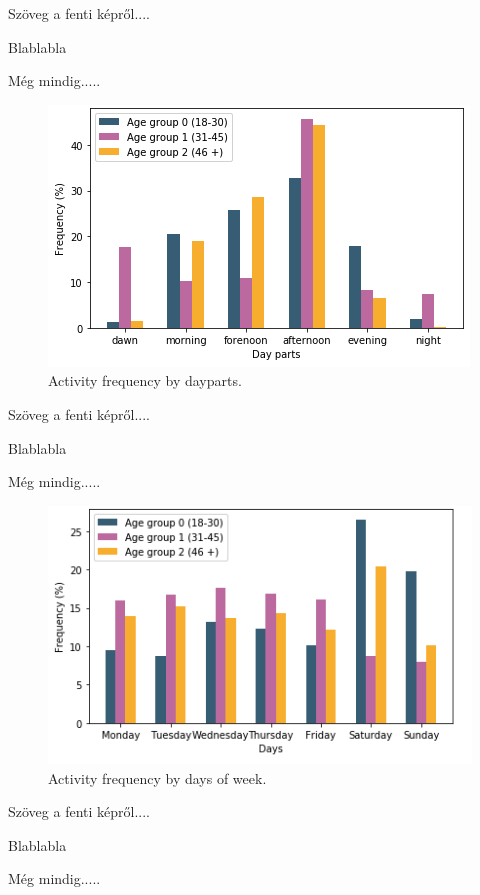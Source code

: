 Szöveg a fenti képről....

Blablabla

Még mindig.....




\begin{figure}[h!]
	\includegraphics{kepek/frequencyByAgeAndDayparts.png}
	\caption{Activity frequency by dayparts.}
	\label{fig:frequencyByDayparts}
\end{figure}


Szöveg a fenti képről....

Blablabla

Még mindig.....


\begin{figure}[h!]
	\includegraphics[width=\linewidth]{kepek/frequencyByAgeAndWeekdays.png}
	\caption{Activity frequency by days of week.}
	\label{fig:frequencyByWeekdays}
\end{figure}

Szöveg a fenti képről....

Blablabla

Még mindig.....




